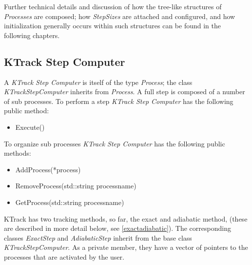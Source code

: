 Further technical details and discussion of how the tree-like structures of \textit{Processes} are composed; how \textit{StepSizes} are attached and configured, and how initialization generally occurs within such structures can be found in the following chapters.

\subsection{KTrack Step Computer}
\label{ktrackstep}  

A \textit{KTrack Step Computer} is itself of the type \textit{Process}; the class \textit{KTrackStepComputer} inherits from \textit{Process}. A full step is composed of a number of sub processes. To perform a step \textit{KTrack Step Computer} has the following public method:
    \begin{itemize}
        \item Execute()
    \end{itemize}
    To organize sub processes \textit{KTrack Step Computer} has the following public methods:
    \begin{itemize}
        \item AddProcess(*process)
        \item RemoveProcess(std::string processname)
        \item GetProcess(std::string processname)
    \end{itemize}
    KTrack has two tracking methods, so far, the exact and adiabatic method, (these are described in more detail below, see \ref{exactadiabatic}). The corresponding classes \textit{ExactStep} and \textit{AdiabaticStep} inherit from the base class \textit{KTrackStepComputer}. As a private member, they have a vector of pointers to the processes that are activated by the user.
    
